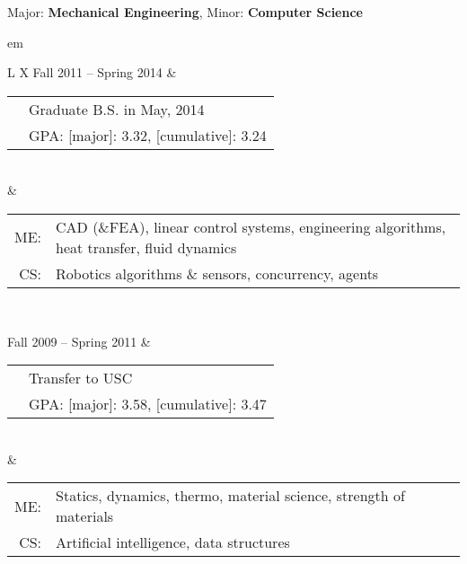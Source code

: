 

{\centering \large{Major: \textbf{Mechanical Engineering}, Minor: \textbf{Computer Science}} \par }

	
{ em
\begin{tabu}{ L{\tabularIndent} X } \hhline{==}
	Fall 2011 -- Spring 2014 & 
	\begin{tabular}{ l | l }
		\multirow{2}{*}{\mysubsection{University of Southern California}} & Graduate B.S. in May, 2014 \\
																		  & GPA: [major]: 3.32, [cumulative]: 3.24 \\
	\end{tabular}
	\\
	&
	\setlength{\tabcolsep}{0.0 em}
	\begin{tabular}{ r l }
		ME: \quad &
		CAD (\&FEA), linear control systems, engineering algorithms, heat transfer, fluid dynamics 
		\\
		CS: \quad &
		Robotics algorithms \& sensors, concurrency, agents \\
	\end{tabular}
	
\\ \hhline{==}

	Fall 2009 -- Spring 2011 & 
	\begin{tabular}{ l | l }
		\multirow{2}{*}{\mysubsection{University of Massachusetts, Amherst}} & Transfer to USC \\
																		  & GPA: [major]: 3.58, [cumulative]: 3.47 \\
	\end{tabular}
	\\
	&
	\setlength{\tabcolsep}{0 em}
	\begin{tabular}{ r l }
		ME: \quad &
		Statics, dynamics, thermo, material science, strength of materials
		\\
		CS: \quad &
		Artificial intelligence, data structures \\
	\end{tabular}
\end{tabu}}
